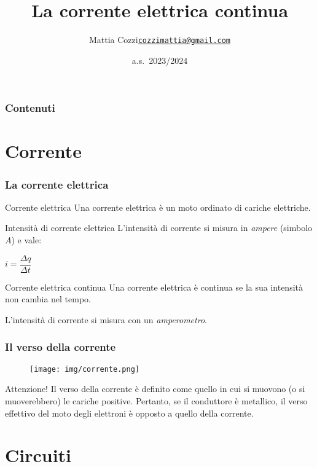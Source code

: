 \documentclass[]{beamer}
\title{La corrente elettrica continua}
\author{\texorpdfstring{Mattia Cozzi\newline\href{mailto:cozzimattia@gmail.com}{\texttt{cozzimattia@gmail.com}}}{Mattia Cozzi}}
\date{a.s.~2023/2024}
\theoremstyle{plain}
\begin{document}
\begin{frame}
  \titlepage
\end{frame}





\begin{frame}
\frametitle{Contenuti}
\tableofcontents
\end{frame}


\section{Corrente}





\begin{frame}
\frametitle{La corrente elettrica}
\begin{block}{Corrente elettrica}
Una corrente elettrica è un moto ordinato di cariche elettriche.
\end{block}\pause
\begin{block}{Intensità di corrente elettrica}
L'intensità di corrente si misura in \emph{ampere} (simbolo $A$) e vale:
\begin{center}
\colorbox{marroncino!30}{$ i = \dfrac{\Delta q}{\Delta t} $}
\end{center}
\end{block}\pause
\begin{block}{Corrente elettrica continua}
Una corrente elettrica è continua se la sua intensità non cambia nel tempo.
\end{block}\pause
L'intensità di corrente si misura con un \emph{amperometro}.
\end{frame}



\begin{frame}
\frametitle{Il verso della corrente}
\begin{figure}
  \texttt{[image: img/corrente.png]}
\end{figure}
\begin{alertblock}{Attenzione!}
Il verso della corrente è definito come quello in cui si muovono (o si muoverebbero) le cariche positive.{\pause} Pertanto, se il conduttore è metallico, il verso effettivo del moto degli elettroni è \alert{opposto} a quello della corrente.
\end{alertblock}
\end{frame}


\section{Circuiti}
\end{document}
